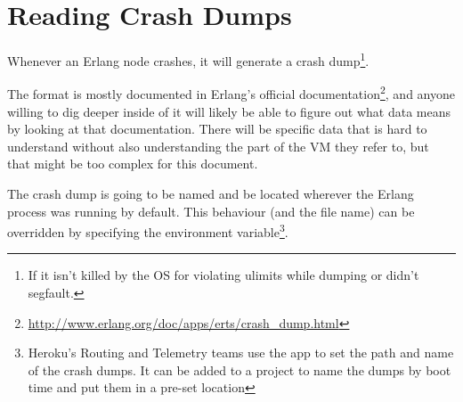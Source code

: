 \documentclass[11pt, oneside]{book}   	%
\begin{document}


\chapter{Reading Crash Dumps}
\label{chap:crash-dumps}

Whenever an Erlang node crashes, it will generate a crash dump\footnote{If it isn't killed by the OS for violating ulimits while dumping or didn't segfault.}.

The format is mostly documented in Erlang's official documentation\footnote{\href{http://www.erlang.org/doc/apps/erts/crash\_dump.html}{http://www.erlang.org/doc/apps/erts/crash\_dump.html}}, and anyone willing to dig deeper inside of it will likely be able to figure out what data means by looking at that documentation. There will be specific data that is hard to understand without also understanding the part of the VM they refer to, but that might be too complex for this document.

The crash dump is going to be named  and be located wherever the Erlang process was running by default. This behaviour (and the file name) can be overridden by specifying the  environment variable\footnote{Heroku's Routing and Telemetry teams use the  app to set the path and name of the crash dumps. It can be added to a project to name the dumps by boot time and put them in a pre-set location}.
\end{document}
